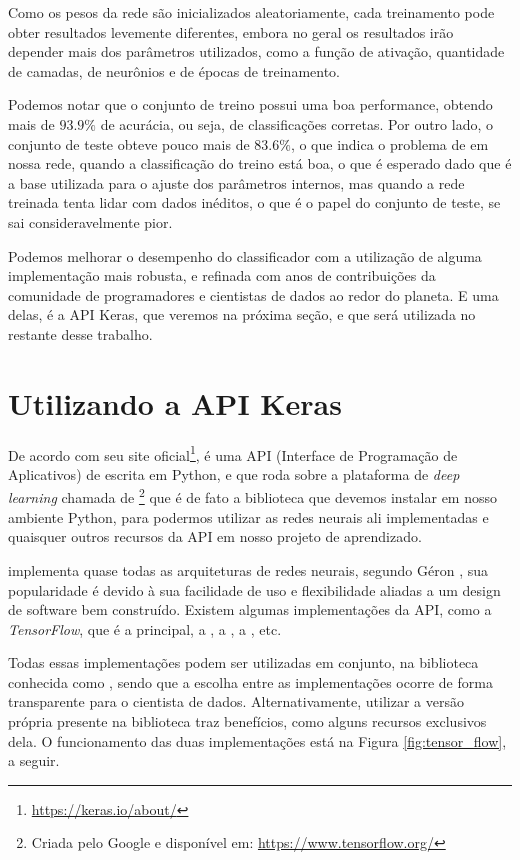 Como os pesos da rede são inicializados aleatoriamente, cada treinamento pode obter resultados levemente diferentes, embora no geral os resultados irão depender mais dos parâmetros utilizados, como a função de ativação, quantidade de camadas, de neurônios e de épocas de treinamento.

Podemos notar que o conjunto de treino possui uma boa performance, obtendo mais de $93.9\%$ de acurácia, ou seja, de classificações corretas. Por outro lado, o conjunto de teste obteve pouco mais de $83.6\%$, o que indica o problema de  em nossa rede, quando a classificação do treino está boa, o que é esperado dado que é a base utilizada para o ajuste dos parâmetros internos, mas quando a rede treinada tenta lidar com dados inéditos, o que é o papel do conjunto de teste, se sai consideravelmente pior.

Podemos melhorar o desempenho do classificador com a utilização de alguma implementação mais robusta, e refinada com anos de contribuições da comunidade de programadores e cientistas de dados ao redor do planeta. E uma delas, é a API Keras, que veremos na próxima seção, e que será utilizada no restante desse trabalho.

\section{Utilizando a API Keras}

De acordo com seu site oficial\footnote{\url{https://keras.io/about/}},  é uma API (Interface de Programação de Aplicativos) de  escrita em Python, e que roda sobre a plataforma de \emph{deep learning} chamada de \footnote{Criada pelo Google e disponível em: \url{https://www.tensorflow.org/}} que é de fato a biblioteca que devemos instalar em nosso ambiente Python, para podermos utilizar as redes neurais ali implementadas e quaisquer outros recursos da API  em nosso projeto de aprendizado.

 implementa quase todas as arquiteturas de redes neurais, segundo Géron \citep{hands}, sua popularidade é devido à sua facilidade de uso e flexibilidade aliadas a um design de software bem construído. Existem algumas implementações da API, como a \emph{TensorFlow}, que é a principal, a , a , a , etc. 

Todas essas implementações podem ser utilizadas em conjunto, na biblioteca conhecida como , sendo que a escolha entre as implementações ocorre de forma transparente para o cientista de dados. Alternativamente, utilizar a versão própria presente na biblioteca  traz benefícios, como alguns recursos exclusivos dela. O funcionamento das duas implementações está na Figura \ref{fig:tensor_flow}, a seguir.

